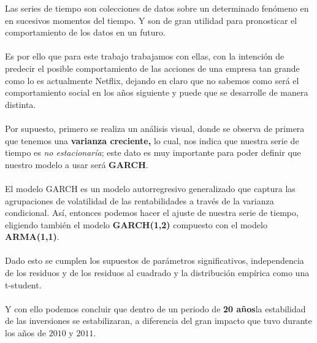 Las series de tiempo son colecciones de datos sobre un determinado fenómeno en  en sucesivos momentos del tiempo. Y son de gran utilidad para pronosticar el comportamiento de los datos en un futuro. 
\\\\
Es por ello que para este trabajo trabajamos con ellas, con la intención de predecir el posible comportamiento de las acciones de una empresa tan grande como lo es actualmente Netflix, dejando en claro que no sabemos como será el comportamiento social en los años siguiente y puede que se desarrolle de manera distinta. 
\\\\
Por supuesto, primero se realiza un análisis visual, donde se observa de primera que tenemos una \textbf{varianza creciente,} lo cual, nos indica que nuestra serie de tiempo es \textit{no estacionaría}; este dato es muy importante para poder definir que nuestro modelo a usar será \textbf{GARCH}. 
\\\\
El modelo GARCH es un modelo autorregresivo generalizado que captura las agrupaciones de volatilidad de las rentabilidades a través de la varianza condicional. Así, entonces podemos hacer el ajuste de nuestra serie de tiempo, eligiendo también el modelo  \textbf{GARCH(1,2)} compuesto con el modelo \textbf{ARMA(1,1)}. 
\\\\
Dado esto se cumplen los supuestos de parámetros significativos, independencia de los residuos y de los residuos al cuadrado y la distribución empírica como una t-student.
\\\\
Y con ello podemos concluir que dentro de un periodo de \textbf{20 años}la estabilidad de las inversiones se estabilizaran, a diferencia del gran impacto que tuvo durante los años de $2010$ y $2011$.

